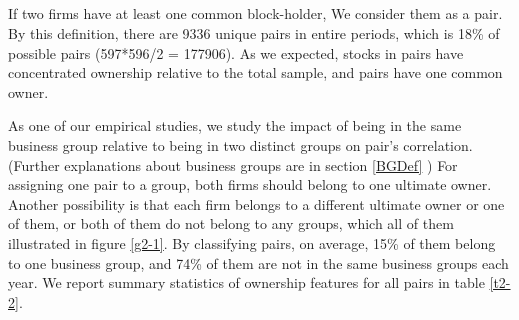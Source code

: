 \subsection{ }
\begin{LTR}
	If two firms have at least one common block-holder, We consider them as a pair. By this definition, there are 9336  unique pairs in entire periods, which is 18\% of possible pairs (597*596/2 = 177906). As we expected, stocks in pairs have concentrated ownership relative to the total sample, and pairs have one common owner.
	
	\normalcolor
	
	As one of our empirical studies, we study the impact of being in the same business group relative to being in two distinct groups on pair's correlation. (Further explanations about business groups are in section \ref{BGDef} )
	For assigning one pair to a group, both firms should belong to one ultimate owner. Another possibility is that each firm belongs to a different ultimate owner or one of them, or both of them do not belong to any groups, which all of them illustrated in figure \ref{g2-1}.
	By classifying pairs, on average, 15\% of them  belong to one business group, and 74\% of them are not in the same business groups  each year. We report summary statistics of ownership features for all pairs in table \ref{t2-2}.
	
	
	\begin{figure}[htbp]
		\centering
		\caption{ Three categories for pairs base on being in business groups}
		\label{g2-1}
		\normalcolor
		\begin{subfigure}[t]{0.9\linewidth}
			
\end{subfigure}
\end{figure}
\end{LTR}
